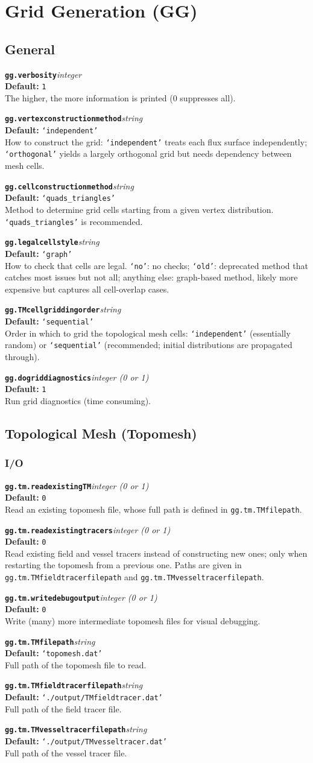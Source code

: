 \documentclass[10pt,a4paper]{article}
\newcommand{\sw}[4]{%
  \par\vspace{0.7em}%
  \begin{minipage}{\linewidth}\raggedright
    \textbf{\texttt{#1}}\hfill\textit{#2}\\[0.1em]
    \textbf{Default:} #3\\[0.1em]
    #4\par
    \vspace{0.3em}{\color{swgrey}\hrule}
  \end{minipage}\par}
\begin{document}
\newpage
\section{Grid Generation (GG)}
\subsection*{General}
\sw{gg.verbosity}{integer}{\texttt{1}}{The higher, the more information is printed (0 suppresses all).}
\sw{gg.vertexconstructionmethod}{string}{\texttt{`independent'}}{How to construct the grid: \texttt{`independent'} treats each flux surface independently; \texttt{`orthogonal'} yields a largely orthogonal grid but needs dependency between mesh cells.}
\sw{gg.cellconstructionmethod}{string}{\texttt{`quads\_triangles'}}{Method to determine grid cells starting from a given vertex distribution. \texttt{`quads\_triangles'} is recommended.}
\sw{gg.legalcellstyle}{string}{\texttt{`graph'}}{How to check that cells are legal. \texttt{`no'}: no checks; \texttt{`old'}: deprecated method that catches most issues but not all; anything else: graph-based method, likely more expensive but captures all cell-overlap cases.}
\sw{gg.TMcellgriddingorder}{string}{\texttt{`sequential'}}{Order in which to grid the topological mesh cells: \texttt{`independent'} (essentially random) or \texttt{`sequential'} (recommended; initial distributions are propagated through).}
\sw{gg.dogriddiagnostics}{integer (0 or 1)}{\texttt{1}}{Run grid diagnostics (time consuming).}

\subsection*{Topological Mesh (Topomesh)}
\subsubsection*{I/O}
\sw{gg.tm.readexistingTM}{integer (0 or 1)}{\texttt{0}}{Read an existing topomesh file, whose full path is defined in \texttt{gg.tm.TMfilepath}.}
\sw{gg.tm.readexistingtracers}{integer (0 or 1)}{\texttt{0}}{Read existing field and vessel tracers instead of constructing new ones; only when restarting the topomesh from a previous one. Paths are given in \texttt{gg.tm.TMfieldtracerfilepath} and \texttt{gg.tm.TMvesseltracerfilepath}.}
\sw{gg.tm.writedebugoutput}{integer (0 or 1)}{\texttt{0}}{Write (many) more intermediate topomesh files for visual debugging.}
\sw{gg.tm.TMfilepath}{string}{\texttt{`topomesh.dat'}}{Full path of the topomesh file to read.}
\sw{gg.tm.TMfieldtracerfilepath}{string}{\texttt{`./output/TMfieldtracer.dat'}}{Full path of the field tracer file.}
\sw{gg.tm.TMvesseltracerfilepath}{string}{\texttt{`./output/TMvesseltracer.dat'}}{Full path of the vessel tracer file.}
\end{document}
